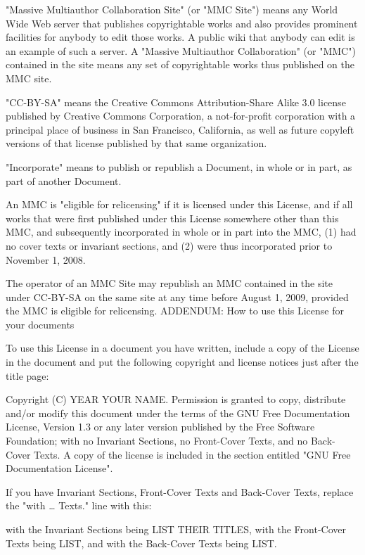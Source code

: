 {\begin{multicols}{4}
"Massive Multiauthor Collaboration Site" (or "MMC Site") means any World Wide Web server that publishes copyrightable works and also provides prominent facilities for anybody to edit those works. A public wiki that anybody can edit is an example of such a server. A "Massive Multiauthor Collaboration" (or "MMC") contained in the site means any set of copyrightable works thus published on the MMC site.

"CC-BY-SA" means the Creative Commons Attribution-Share Alike 3.0 license published by Creative Commons Corporation, a not-for-profit corporation with a principal place of business in San Francisco, California, as well as future copyleft versions of that license published by that same organization.

"Incorporate" means to publish or republish a Document, in whole or in part, as part of another Document.

An MMC is "eligible for relicensing" if it is licensed under this License, and if all works that were first published under this License somewhere other than this MMC, and subsequently incorporated in whole or in part into the MMC, (1) had no cover texts or invariant sections, and (2) were thus incorporated prior to November 1, 2008.

The operator of an MMC Site may republish an MMC contained in the site under CC-BY-SA on the same site at any time before August 1, 2009, provided the MMC is eligible for relicensing.
ADDENDUM: How to use this License for your documents

To use this License in a document you have written, include a copy of the License in the document and put the following copyright and license notices just after the title page:

    Copyright (C)  YEAR  YOUR NAME.
    Permission is granted to copy, distribute and/or modify this document
    under the terms of the GNU Free Documentation License, Version 1.3
    or any later version published by the Free Software Foundation;
    with no Invariant Sections, no Front-Cover Texts, and no Back-Cover Texts.
    A copy of the license is included in the section entitled "GNU
    Free Documentation License".

If you have Invariant Sections, Front-Cover Texts and Back-Cover Texts, replace the "with … Texts." line with this:

    with the Invariant Sections being LIST THEIR TITLES, with the
    Front-Cover Texts being LIST, and with the Back-Cover Texts being LIST.


\end{multicols}}

